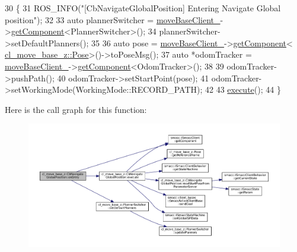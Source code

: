 \begin{DoxyCode}
30 \{
31   ROS\_INFO(\textcolor{stringliteral}{"[CbNavigateGlobalPosition] Entering Navigate Global position"});
32 
33   \textcolor{keyword}{auto} plannerSwitcher = \hyperlink{classcl__move__base__z_1_1CbMoveBaseClientBehaviorBase_ab2ef219464cfac8659b4a87c8d0db6d5}{moveBaseClient\_}->\hyperlink{classsmacc_1_1ISmaccClient_adef78db601749ca63c19e74a27cb88cc}{getComponent}<PlannerSwitcher>();
34   plannerSwitcher->setDefaultPlanners();
35 
36   \textcolor{keyword}{auto} pose = \hyperlink{classcl__move__base__z_1_1CbMoveBaseClientBehaviorBase_ab2ef219464cfac8659b4a87c8d0db6d5}{moveBaseClient\_}->\hyperlink{classsmacc_1_1ISmaccClient_adef78db601749ca63c19e74a27cb88cc}{getComponent}<
      \hyperlink{classcl__move__base__z_1_1Pose}{cl\_move\_base\_z::Pose}>()->toPoseMsg();
37   \textcolor{keyword}{auto} *odomTracker = \hyperlink{classcl__move__base__z_1_1CbMoveBaseClientBehaviorBase_ab2ef219464cfac8659b4a87c8d0db6d5}{moveBaseClient\_}->\hyperlink{classsmacc_1_1ISmaccClient_adef78db601749ca63c19e74a27cb88cc}{getComponent}<OdomTracker>();
38 
39   odomTracker->pushPath();
40   odomTracker->setStartPoint(pose);
41   odomTracker->setWorkingMode(WorkingMode::RECORD\_PATH);
42 
43   \hyperlink{classcl__move__base__z_1_1CbNavigateGlobalPosition_a0b8525ea9e4388b27cb1f9b1e06a3b63}{execute}();
44 \}
\end{DoxyCode}
Here is the call graph for this function\+:
\nopagebreak
\begin{figure}[H]
\begin{center}
\leavevmode
\includegraphics[width=350pt]{classcl__move__base__z_1_1CbNavigateGlobalPosition_a66d8b0555ef2945bc108dcd5171be292_cgraph}
\end{center}
\end{figure}
\mbox{\label{classcl__move__base__z_1_1CbNavigateGlobalPosition_a5c18268af1e7fc236aa155a58345d5d7}} 
